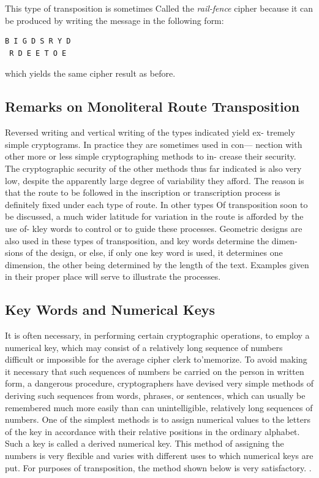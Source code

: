 This type of transposition is sometimes Called the \textit{rail-fence} cipher
because it can be produced by writing the message in the following form:


\begin{verbatim}
B I G D S R Y D
 R D E E T O E
\end{verbatim}

which yields the same cipher result as before.

\subsection{Remarks on Monoliteral Route Transposition}

Reversed writing and vertical writing of the types indicated yield ex-
tremely simple cryptograms. In practice they are sometimes used in con—
nection with other more or less simple cryptographing methods to in-
crease their security. The cryptographic security of the other methods
thus far indicated is also very low, despite the apparently large degree of
variability they afford. The reason is that the route to be followed in the
inscription or transcription process is definitely fixed under each type of
route. In other types Of transposition soon to be discussed, a much
wider latitude for variation in the route is afforded by the use of- kley
words to control or to guide these processes. Geometric designs are also
used in these types of transposition, and key words determine the dimen-
sions of the design, or else, if only one key word is used, it determines
one dimension, the other being determined by the length of the text.
Examples given in their proper place will serve to illustrate the processes.

\subsection{Key Words and Numerical Keys}

\mypara It is often necessary, in performing certain cryptographic operations, to employ a numerical key, which may consist of a relatively long
sequence of numbers difficult or impossible for the average cipher clerk
to'memorize. To avoid making it necessary that such sequences of numbers be carried on the person in written form, a dangerous procedure,
cryptographers have devised very simple methods of deriving such
sequences from words, phrases, or sentences, which can usually be remembered much more easily than can unintelligible, relatively long sequences of numbers. One of the simplest methods is to assign numerical
values to the letters of the key in accordance with their relative positions
in the ordinary alphabet. Such a key is called a derived numerical key.
This method of assigning the numbers is very ﬂexible and varies with
different uses to which numerical keys are put. For purposes of transposition, the method shown below is very satisfactory. .

